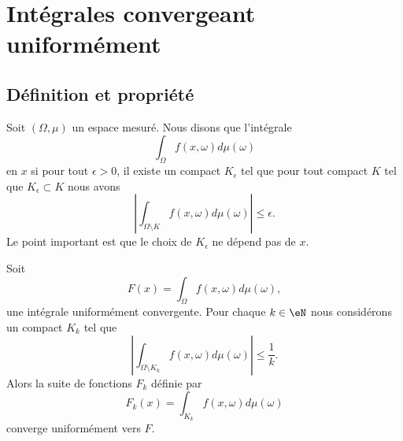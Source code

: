 
\section{Intégrales convergeant uniformément}

\subsection{Définition et propriété}

\begin{definition}      \label{DEFooSHWAooWtswtp}
    Soit \( (\Omega,\mu)\) un espace mesuré. Nous disons que l'intégrale
    \begin{equation}
        \int_{\Omega}f(x,\omega)d\mu(\omega)
    \end{equation}
     en \( x\) si pour tout \( \epsilon>0\), il existe un compact \( K_{\epsilon}\) tel que pour tout compact \( K\) tel que \( K_{\epsilon}\subset K\) nous avons
    \begin{equation}
        \left| \int_{\Omega\setminus K}f(x,\omega)d\mu(\omega) \right| \leq \epsilon.
    \end{equation}
    Le point important est que le choix de \( K_{\epsilon}\) ne dépend pas de \( x\).
\end{definition}

\begin{lemma}       \label{LemOgQdpJ}
    Soit
    \begin{equation}
        F(x)=\int_{\Omega}f(x,\omega)d\mu(\omega),
    \end{equation}
    une intégrale uniformément convergente. Pour chaque \( k\in \eN\) nous considérons un compact \( K_k\) tel que
    \begin{equation}
        \left| \int_{\Omega\setminus K_k}f(x,\omega)d\mu(\omega) \right| \leq\frac{1}{ k }.
    \end{equation}
    Alors la suite de fonctions \( F_k\) définie par
    \begin{equation}
        F_k(x)=\int_{K_k}f(x,\omega)d\mu(\omega)
    \end{equation}
    converge uniformément vers \( F\).
\end{lemma}

